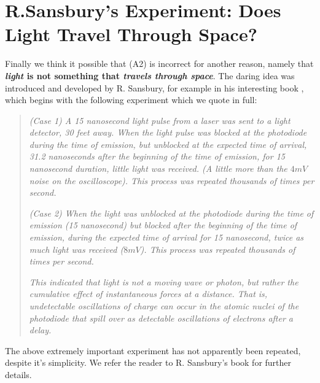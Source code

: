 \documentclass[12pt]{amsart}
\theoremstyle{definition}
\theoremstyle{remark}
\begin{document}
\section{R.Sansbury's Experiment: Does Light Travel Through Space?}
Finally we think it possible that (A2) is incorrect for another reason, namely that \textbf{\emph{light} is not something that \emph{travels through space}}. The daring idea was introduced and developed by R. Sansbury, for example in his interesting book \cite{sansburyspeed}, which begins with the following experiment which we quote in full:
\begin{quote}
\emph{ (Case 1) A 15 nanosecond light pulse from a laser was sent to a light detector, 30 feet away. When the light pulse was blocked at the photodiode during the time of emission, but unblocked at the expected time of arrival, 31.2 nanoseconds after the beginning of the time of emission, for 15 nanosecond duration, little light was received. (A little more than the $4mV$ noise on the oscilloscope). This process was repeated thousands of times per second.}

\emph{(Case 2) When the light was unblocked at the photodiode during the time of emission (15 nanosecond) but blocked after the beginning of the time of emission, during the expected time of arrival for 15 nanosecond, twice as much light was received ($8mV$). This process was repeated thousands of times per second.}

\emph{This indicated that light is not a moving wave or photon, but rather the cumulative effect of instantaneous forces at a distance. That is, undetectable oscillations of charge can occur in the atomic nuclei of the photodiode that spill over as detectable oscillations of electrons after a delay.}
\end{quote}

The above extremely important experiment has not apparently been repeated, despite it's simplicity. We refer the reader to R. Sansbury's book for further details.





\end{document}
